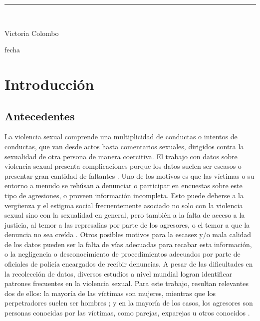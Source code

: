 \documentclass[10 pt]{article}
\begin{document}
\begin{titlepage}
\begin{center}
    
    \vspace*{0.3in}
    \rule{80mm}{0.1mm}\\
    \vspace*{0.1in}
    \begin{large}
    Victoria Colombo
    
    \vspace*{0.3in}
    
    \vspace*{0.1in}fecha
    \end{large}
    \end{center}
    
    \end{titlepage}

\newpage

\begin{abstract}


\end{abstract}
\newpage
\tableofcontents
\newpage

\section{Introducción}\label{intro}

\subsection{Antecedentes}


La violencia sexual comprende una multiplicidad de conductas o intentos de conductas, que van desde actos hasta comentarios sexuales, dirigidos contra la sexualidad de otra persona de manera coercitiva. El trabajo con datos sobre violencia sexual presenta complicaciones porque los datos suelen ser escasos o presentar gran cantidad de faltantes \citetext{\citealp[p.~150]{ferris2002world}}. Uno de los motivos es que las víctimas o su entorno a menudo se rehúsan a denunciar o participar en encuestas sobre este tipo de agresiones, o proveen información incompleta. Esto puede deberse a la vergüenza y el estigma social frecuentemente asociado no solo con la violencia sexual sino con la sexualidad en general, pero también a la falta de acceso a la justicia, al temor a las represalias por parte de los agresores, o el temor a que la denuncia no sea creída \citep*{murphy2022unfounded}. Otros posibles motivos para la escasez y/o mala calidad de los datos pueden ser la falta de vías adecuadas para recabar esta información, o la negligencia o desconocimiento de procedimientos adecuados por parte de oficiales de policía encargados de recibir denuncias. A pesar de las dificultades en la recolección de datos, diversos estudios a nivel mundial logran identificar patrones frecuentes en la violencia sexual. Para este trabajo, resultan relevantes dos de ellos: la mayoría de las víctimas son mujeres, mientras que los perpetradores suelen ser hombres \citetext{\citealp[p.~149]{ferris2002world}; \citealp[p.~15]{contreras2016violencia}}; y en la mayoría de los casos, los agresores son personas conocidas por las víctimas, como parejas, exparejas u otros conocidos \citetext{\citealp[p.~9]{garcia2005multi},\citealp[p.~22]{unicef2018analisis}, \citealp[p.~151]{ferris2002world}}.
 
\end{document}
